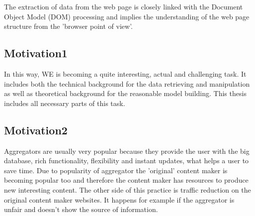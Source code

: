 The extraction of data from the web page is closely linked with the Document Object Model (DOM) processing and implies the understanding of the web page structure from the 'browser point of view'. \\
\subsection{Motivation1}
In this way, WE is becoming a quite interesting, actual and challenging task. It includes both the technical background for the data retrieving and manipulation as well as theoretical background for the reasonable model building. This thesis includes all necessary parts of this task.
\subsection{Motivation2}
Aggregators are usually very popular because they provide the user with the big database, rich functionality, flexibility and instant updates, what helps a user to save time. Due to popularity of aggregator the 'original' content maker is becoming popular too and therefore the content maker has resources to produce new interesting content. The other side of this practice is traffic reduction on the original content maker websites. It happens for example if the aggregator is unfair and doesn't show the source of information. \\

